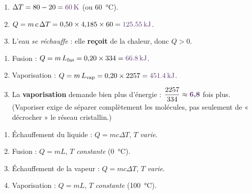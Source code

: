 \documentclass[11pt,a4paper]{article}
\newcommand{\rep}[1]{\textcolor{primarydark}{\textbf{#1}}}
\begin{document}
\begin{center}
\end{center}

\begin{correction}
\begin{enumerate}[label=\alph*),leftmargin=2em,topsep=2pt,itemsep=2pt]
  \item $\Delta T = 80 - 20 = \rep{\SI{60}{\kelvin}}$ (ou \SI{60}{\celsius}).
  \item $Q = m\,c\,\Delta T = 0{,}50 \times 4{,}185 \times 60 = \rep{\SI{125.55}{\kilo\joule}}$.
  \item L'eau \emph{se réchauffe} : elle \rep{reçoit} de la chaleur, donc $Q>0$.
\end{enumerate}
\end{correction}

\begin{correction}
\begin{enumerate}[label=\alph*),leftmargin=2em,topsep=2pt,itemsep=2pt]
  \item Fusion : $Q = m\,L_{\text{fus}} = 0{,}20 \times 334 = \rep{\SI{66.8}{\kilo\joule}}$.
  \item Vaporisation : $Q = m\,L_{\text{vap}} = 0{,}20 \times 2257 = \rep{\SI{451.4}{\kilo\joule}}$.
  \item La \rep{vaporisation} demande bien plus d'énergie : $\dfrac{2257}{334}\approx \rep{6{,}8}$ fois plus.
        (Vaporiser exige de séparer complètement les molécules, pas seulement de « décrocher » le réseau cristallin.)
\end{enumerate}
\end{correction}

\begin{correction}
\begin{enumerate}[label=\alph*),leftmargin=2em,topsep=2pt,itemsep=2pt]
  \item Échauffement du liquide : \rep{$Q=mc\Delta T$}, $T$ \emph{varie}.
  \item Fusion : \rep{$Q=mL$}, $T$ \emph{constante} (\SI{0}{\celsius}).
  \item Échauffement de la vapeur : \rep{$Q=mc\Delta T$}, $T$ \emph{varie}.
  \item Vaporisation : \rep{$Q=mL$}, $T$ \emph{constante} (\SI{100}{\celsius}).
\end{enumerate}
\end{correction}
\end{document}
